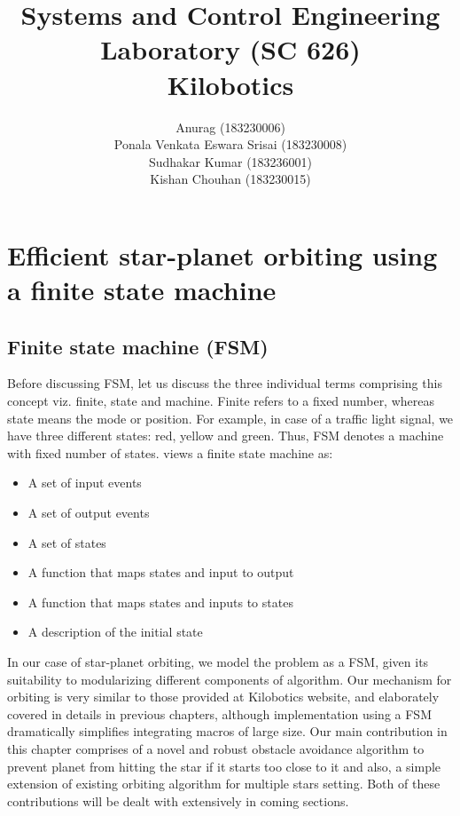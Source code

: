 \documentclass{report}[12pt]
\author{Anurag (183230006) \\ Ponala Venkata Eswara Srisai
(183230008)\\ Sudhakar Kumar (183236001)\\ Kishan Chouhan (183230015)}
\title{Systems and Control Engineering Laboratory (SC 626) \\ Kilobotics}
\begin{document}
\maketitle
\tableofcontents
\listoffigures
\thispagestyle{empty}
\mbox{}


\chapter{Efficient star-planet orbiting using a finite state machine}
\section{Finite state machine (FSM)}
Before discussing FSM, let us discuss the three individual terms comprising this concept viz. finite, state and machine. Finite refers to a fixed number, whereas state means the mode or position. For example, in case of a traffic light signal, we have three different states: red, yellow and green. Thus, FSM denotes a machine with fixed number of states. \cite{LL-GM-BS-rderts} views a finite state machine as:
\begin{itemize}
	\item A set of input events
	\item A set of output events
	\item A set of states
	\item A function that maps states and input to output
	\item A function that maps states and inputs to states
	\item A description of the initial state
\end{itemize}
\noindent In our case of star-planet orbiting, we model the problem as a FSM, given its suitability to modularizing different components of algorithm. Our mechanism for orbiting is very similar to those provided at Kilobotics website, and elaborately covered in details in previous chapters, although implementation using a FSM dramatically simplifies integrating macros of large size. Our main contribution in this chapter comprises of a novel and robust obstacle avoidance algorithm to prevent planet from hitting the star if it starts too close to it and also, a simple extension of existing orbiting algorithm for multiple stars setting. Both of these contributions will be dealt with extensively in coming sections. 
\end{document}

